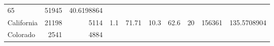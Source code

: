 \documentclass[]{article}
\begin{document}
\begin{longtable}[]{@{}lrrrrrrrrr@{}}
\begin{minipage}[t]{0.06\columnwidth}
65\strut
\end{minipage} & \begin{minipage}[t]{0.05\columnwidth}\raggedleft\strut
51945\strut
\end{minipage} & \begin{minipage}[t]{0.10\columnwidth}\raggedleft\strut
40.6198864\strut
\end{minipage}\tabularnewline
\begin{minipage}[t]{0.08\columnwidth}\raggedright\strut
California\strut
\end{minipage} & \begin{minipage}[t]{0.08\columnwidth}\raggedleft\strut
21198\strut
\end{minipage} & \begin{minipage}[t]{0.07\columnwidth}\raggedleft\strut
5114\strut
\end{minipage} & \begin{minipage}[t]{0.10\columnwidth}\raggedleft\strut
1.1\strut
\end{minipage} & \begin{minipage}[t]{0.07\columnwidth}\raggedleft\strut
71.71\strut
\end{minipage} & \begin{minipage}[t]{0.05\columnwidth}\raggedleft\strut
10.3\strut
\end{minipage} & \begin{minipage}[t]{0.07\columnwidth}\raggedleft\strut
62.6\strut
\end{minipage} & \begin{minipage}[t]{0.06\columnwidth}\raggedleft\strut
20\strut
\end{minipage} & \begin{minipage}[t]{0.05\columnwidth}\raggedleft\strut
156361\strut
\end{minipage} & \begin{minipage}[t]{0.10\columnwidth}\raggedleft\strut
135.5708904\strut
\end{minipage}\tabularnewline
\begin{minipage}[t]{0.08\columnwidth}\raggedright\strut
Colorado\strut
\end{minipage} & \begin{minipage}[t]{0.08\columnwidth}\raggedleft\strut
2541\strut
\end{minipage} & \begin{minipage}[t]{0.07\columnwidth}\raggedleft\strut
4884\strut
\end{minipage} & \begin{minipage}[t]{0.10\columnwidth}\raggedleft\strut

\end{minipage}
\end{longtable}
\end{document}
